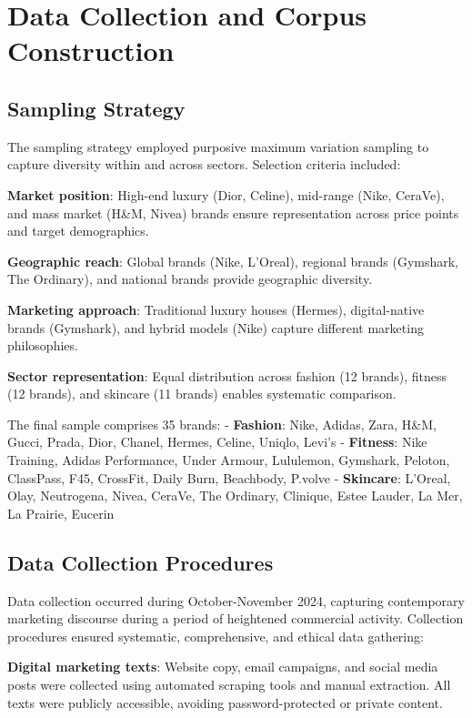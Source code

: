 \section{Data Collection and Corpus Construction}
\label{sec:data_collection}

\subsection{Sampling Strategy}

The sampling strategy employed purposive maximum variation sampling to capture diversity within and across sectors. Selection criteria included:

\textbf{Market position}: High-end luxury (Dior, Celine), mid-range (Nike, CeraVe), and mass market (H\&M, Nivea) brands ensure representation across price points and target demographics.

\textbf{Geographic reach}: Global brands (Nike, L'Oreal), regional brands (Gymshark, The Ordinary), and national brands provide geographic diversity.

\textbf{Marketing approach}: Traditional luxury houses (Hermes), digital-native brands (Gymshark), and hybrid models (Nike) capture different marketing philosophies.

\textbf{Sector representation}: Equal distribution across fashion (12 brands), fitness (12 brands), and skincare (11 brands) enables systematic comparison.

The final sample comprises 35 brands:
- \textbf{Fashion}: Nike, Adidas, Zara, H\&M, Gucci, Prada, Dior, Chanel, Hermes, Celine, Uniqlo, Levi's
- \textbf{Fitness}: Nike Training, Adidas Performance, Under Armour, Lululemon, Gymshark, Peloton, ClassPass, F45, CrossFit, Daily Burn, Beachbody, P.volve
- \textbf{Skincare}: L'Oreal, Olay, Neutrogena, Nivea, CeraVe, The Ordinary, Clinique, Estee Lauder, La Mer, La Prairie, Eucerin

\subsection{Data Collection Procedures}

Data collection occurred during October-November 2024, capturing contemporary marketing discourse during a period of heightened commercial activity. Collection procedures ensured systematic, comprehensive, and ethical data gathering:

\textbf{Digital marketing texts}: Website copy, email campaigns, and social media posts were collected using automated scraping tools and manual extraction. All texts were publicly accessible, avoiding password-protected or private content.


